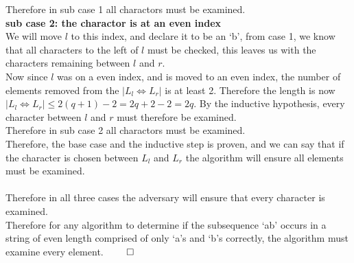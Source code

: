 \documentclass{article}
\begin{document}
      \indent Therefore in sub case 1 all charactors must be examined.\\
      \indent \textbf{sub case 2: the charactor is at an even index} \\
      \indent We will move $l$ to this index, and declare it to be an `b', from case 1, we know that all characters to the left of $l$ must be checked, this leaves us with the characters remaining between $l$ and $r$.\\
      \indent Now since $l$ was on a even index, and is moved to an even index, the number of elements removed from the $|L_{l} \Leftrightarrow L_{r}|$ is at least 2. Therefore the length is now $|L_{l} \Leftrightarrow L_{r}| \leq 2(q + 1) - 2 = 2q + 2 - 2 = 2q$. By the inductive hypothesis, every character between $l$ and $r$ must therefore be examined.\\
      \indent Therefore in sub case 2 all charactors must be examined.\\
      Therefore, the base case and the inductive step is proven, and we can say that if the character is chosen between $L_{l}$ and $L_{r}$ the algorithm will ensure all elements must be examined.\\
      \\
      Therefore in all three cases the adversary will ensure that every character is examined.\\
      Therefore for any algorithm to determine if the subsequence `ab' occurs in a string of even length comprised of only `a's and `b's correctly, the algorithm must examine every element. $\qed$
\end{document}
